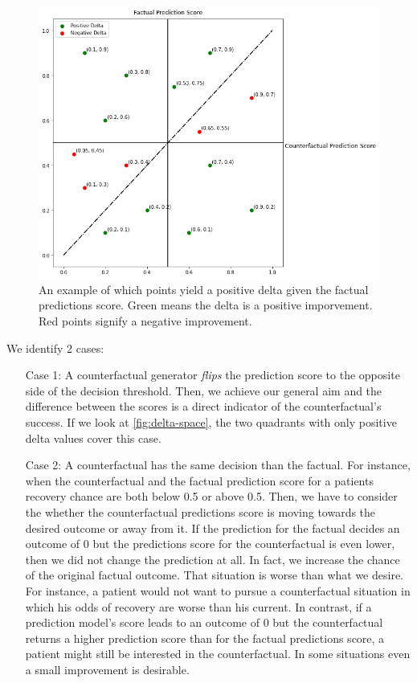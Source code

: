 \documentclass[./../../paper.tex]{subfiles}
\begin{document}
\begin{figure}[htbp]
    \centering
    \includegraphics[width=\textwidth]{figures/generated/delta-space.png}
    \caption{An example of which points yield a positive delta given the factual predictions score. Green means the delta is a positive imporvement. Red points signify a negative improvement.}
    \label{fig:delta-space}    
\end{figure}

We identify 2 cases:
\begin{enumerate}
    \item[Case 1:] A counterfactual generator \emph{flips} the prediction score to the opposite side of the decision threshold. Then, we achieve our general aim and the difference between the scores is a direct indicator of the counterfactual's success. If we look at \autoref{fig:delta-space}, the two quadrants with only positive delta values cover this case.   
    \item[Case 2:] A counterfactual has the same decision than the factual. For instance, when the counterfactual and the factual prediction score for a patients recovery chance are  both below 0.5 or above 0.5. Then, we have to consider the whether the counterfactual predictions score is moving towards the desired outcome or away from it. 
    \subitem[2.1] If the prediction for the factual decides an outcome of 0 but the predictions score for the counterfactual is even lower, then we did not change the prediction at all. In fact, we increase the chance of the original factual outcome. That situation is worse than what we desire. For instance, a patient would not want to pursue a counterfactual situation in which his odds of recovery are worse than his current.   
    \subitem[2.2] In contrast, if a prediction model's score leads to an outcome of 0 but the counterfactual returns a higher prediction score than for the factual predictions score, a patient might still be interested in the counterfactual. In some situations even a small improvement is desirable.   
\end{enumerate}
\end{document}
